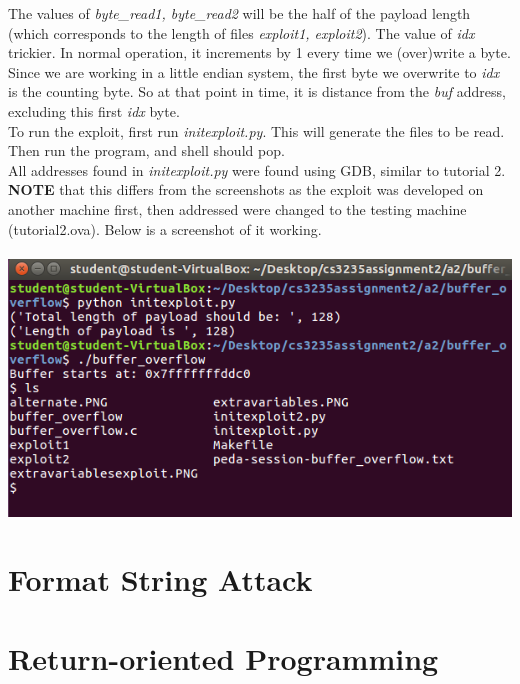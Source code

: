 \documentclass[12pt]{article}
\begin{document}
The values of \emph{byte\_read1, byte\_read2} will be the half of the payload length (which corresponds to the length of files \emph{exploit1, exploit2}). The value of \emph{idx} trickier. In normal operation, it increments by 1 every time we (over)write a byte. Since we are working in a little endian system, the first byte we overwrite to \emph{idx} is the counting byte. So at that point in time, it is distance from the \emph{buf} address, excluding this first \emph{idx} byte.\\

To run the exploit, first run \emph{initexploit.py}. This will generate the files to be read. Then run the program, and shell should pop.\\

All addresses found in \emph{initexploit.py} were found using GDB, similar to tutorial 2. \textbf{NOTE} that this differs from the screenshots as the exploit was developed on another machine first, then addressed were changed to the testing machine (tutorial2.ova). Below is a screenshot of it working.\\\\
\includegraphics[scale=1.2]{./a2/buffer_overflow/result.PNG}


\newpage
\section{Format String Attack}






\newpage
\section{Return-oriented Programming}
\end{document}
